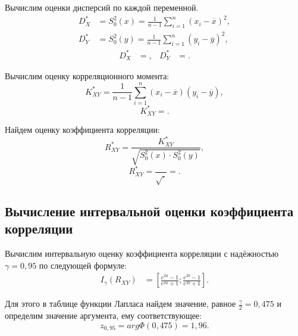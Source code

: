 \documentclass[14pt,hidelinks]{extarticle}
\begin{document}
Вычислим оценки дисперсий по каждой переменной.
\begin{equation}
  \begin{aligned}
    D^*_X &= S^2_0(x) = \frac{1}{n-1} \sum_{i=1}^{n} (x_i - \overline{x})^2, \\
    D^*_Y &= S^2_0(y) = \frac{1}{n-1} \sum_{i=1}^{n} (y_i - \overline{y})^2,
  \end{aligned}
\end{equation} 
\begin{equation*}
  \begin{aligned}
    D^*_X &= , &
    D^*_Y &= .
  \end{aligned}
\end{equation*}

Вычислим оценку корреляционного момента:
\begin{equation}
  K^*_{XY} = \frac{1}{n-1} \sum_{i=1}^{n}{(x_i - \overline{x})(y_i - \overline{y})},
\end{equation} 
\begin{equation*}
  K^*_{XY} = .
\end{equation*}

Найдем оценку коэффициента корреляции:
\begin{equation}
  R^*_{XY} = \frac{K^*_{XY}}{\sqrt{S^2_0(x) \cdot S^2_0(y)}},
\end{equation} 
\begin{equation*}
  R^*_{XY} = \dfrac{}
  {\sqrt{ \cdot }} = 
  .
\end{equation*}

\subsection{Вычисление интервальной оценки коэффициента корреляции}

Вычислим интервальную оценку коэффициента корреляции с надёжностью $\gamma = 0,95$ по следующей формуле:
\begin{align}
  I_{\gamma} (R_{XY}) &= \left[ \frac{e^{2a}-1}{e^{2a}+1}; \frac{e^{2b}-1}{e^{2b}+1} \right]. 
\end{align}

Для этого в таблице функции Лапласа найдем значение, равное $\frac{\gamma}{2} = 0,475$ и определим значение аргумента, ему соответствующее:
\begin{equation*}
  z_{0,95} = arg \Phi (0,475) = 1,96. 
\end{equation*}
\end{document}
